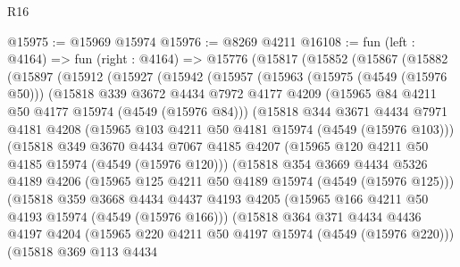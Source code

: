 \begin{lexlean}{R16}
\begin{coremodule}
@15975 := @15969 @15974
@15976 := @8269 @4211
@16108 := fun (left : @4164) =>
  fun (right : @4164) =>
  @15776
    (@15817
      (@15852
        (@15867
          (@15882
            (@15897
              (@15912
                (@15927
                  (@15942
                    (@15957
                      (@15963
                        (@15975 (@4549 (@15976 @50)))
                        (@15818
                          @339
                          @3672
                          @4434
                          @7972
                          @4177
                          @4209
                          (@15965 @84 @4211 @50 @4177 @15974 (@4549 (@15976 @84)))
                          (@15818
                            @344
                            @3671
                            @4434
                            @7971
                            @4181
                            @4208
                            (@15965 @103 @4211 @50 @4181 @15974 (@4549 (@15976 @103)))
                            (@15818
                              @349
                              @3670
                              @4434
                              @7067
                              @4185
                              @4207
                              (@15965 @120 @4211 @50 @4185 @15974 (@4549 (@15976 @120)))
                              (@15818
                                @354
                                @3669
                                @4434
                                @5326
                                @4189
                                @4206
                                (@15965 @125 @4211 @50 @4189 @15974 (@4549 (@15976 @125)))
                                (@15818
                                  @359
                                  @3668
                                  @4434
                                  @4437
                                  @4193
                                  @4205
                                  (@15965 @166 @4211 @50 @4193 @15974 (@4549 (@15976 @166)))
                                  (@15818
                                    @364
                                    @371
                                    @4434
                                    @4436
                                    @4197
                                    @4204
                                    (@15965 @220 @4211 @50 @4197 @15974 (@4549 (@15976 @220)))
                                    (@15818
                                      @369
                                      @113
                                      @4434

\end{coremodule}
\end{lexlean}
